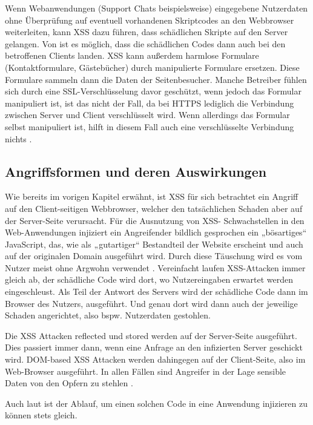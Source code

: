 Wenn Webanwendungen (Support Chats beispielsweise) eingegebene Nutzerdaten ohne Überprüfung auf eventuell vorhandenen Skriptcodes an den Webbrowser weiterleiten, kann XSS dazu führen, dass schädlichen Skripte auf den Server gelangen. Von ist es möglich, dass die schädlichen Codes dann auch bei den betroffenen Clients landen. XSS kann außerdem harmlose Formulare (Kontaktformulare, Gästebücher) durch manipulierte Formulare ersetzen. Diese Formulare sammeln dann die Daten der Seitenbesucher. Manche Betreiber fühlen sich durch eine SSL-Verschlüsselung davor geschützt, wenn jedoch das Formular manipuliert ist, ist das nicht der Fall, da bei HTTPS lediglich die Verbindung zwischen Server und Client verschlüsselt wird. Wenn allerdings das Formular selbst manipuliert ist, hilft in diesem Fall auch eine verschlüsselte Verbindung nichts \autocite{schuring2017}.

\subsection{Angriffsformen und deren Auswirkungen}
\label{subsection:attack_forms_and_their_impact}

Wie bereits im vorigen Kapitel erwähnt, ist XSS für sich betrachtet ein Angriff auf den Client-seitigen Webbrowser, welcher den tatsächlichen Schaden aber auf der Server-Seite verursacht. Für die Ausnutzung von XSS- Schwachstellen in den Web-Anwendungen injiziert ein Angreifender bildlich gesprochen ein „bösartiges“ JavaScript, das, wie als „gutartiger“ Bestandteil der Website erscheint und auch auf der originalen Domain ausgeführt wird. Durch diese Täuschung wird es vom Nutzer meist ohne Argwohn verwendet \autocite[5]{gupta2017}. Vereinfacht laufen XSS-Attacken immer gleich ab, der schädliche Code wird dort, wo Nutzereingaben erwartet werden eingeschleust. Als Teil der Antwort des Servers wird der schädliche Code dann im Browser des Nutzers, ausgeführt. Und genau dort wird dann auch der jeweilige Schaden angerichtet, also bspw. Nutzerdaten gestohlen.

Die XSS Attacken reflected und stored werden auf der Server-Seite ausgeführt. Dies passiert immer dann, wenn eine Anfrage an den infizierten Server geschickt wird. DOM-based XSS Attacken werden dahingegen auf der Client-Seite, also im Web-Browser ausgeführt. In allen Fällen sind Angreifer in der Lage sensible Daten von den Opfern zu stehlen \autocite{hydara2015a}.

Auch laut \textcite{mahmoud2017} ist der Ablauf, um einen solchen Code in eine Anwendung injizieren zu können stets gleich.


